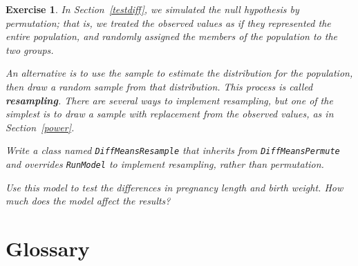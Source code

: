 \documentclass[12pt]{book}
\theoremstyle{exercise}
\newtheorem{exercise}{Exercise}[chapter]
\begin{document}
\begin{exercise}

In Section~\ref{testdiff}, we simulated the null hypothesis by
permutation; that is, we treated the observed values as if they
represented the entire population, and randomly assigned the
members of the population to the two groups.%
%

An alternative is to use the sample to estimate the distribution for
the population, then draw a random sample from that distribution.
This process is called {\bf resampling}.  There are several ways to
implement resampling, but one of the simplest is to draw a sample
with replacement from the observed values, as in Section~\ref{power}.%
%

Write a class named {\tt DiffMeansResample} that inherits from
{\tt DiffMeansPermute} and overrides {\tt RunModel} to implement
resampling, rather than permutation.%

Use this model to test the differences in pregnancy length and
birth weight.  How much does the model affect the results?%
%
%
%

\end{exercise}


\section{Glossary}
\end{document}
